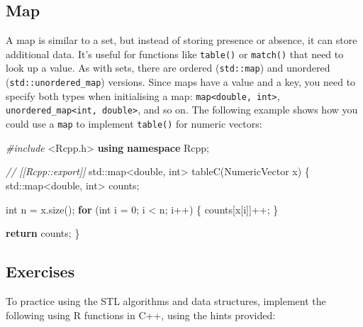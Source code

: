 \documentclass[]{book}
\newenvironment{Shaded}{\begin{snugshade}}{\end{snugshade}}
\newcommand{\BuiltInTok}[1]{#1}
\newcommand{\CommentTok}[1]{\textcolor[rgb]{0.37,0.37,0.37}{\textit{#1}}}
\newcommand{\ControlFlowTok}[1]{\textcolor[rgb]{0.27,0.27,0.27}{\textbf{#1}}}
\newcommand{\DataTypeTok}[1]{\textcolor[rgb]{0.27,0.27,0.27}{#1}}
\newcommand{\DecValTok}[1]{\textcolor[rgb]{0.06,0.06,0.06}{#1}}
\newcommand{\ImportTok}[1]{#1}
\newcommand{\KeywordTok}[1]{\textcolor[rgb]{0.27,0.27,0.27}{\textbf{#1}}}
\newcommand{\NormalTok}[1]{#1}
\newcommand{\PreprocessorTok}[1]{\textcolor[rgb]{0.37,0.37,0.37}{\textit{#1}}}
\begin{document}
\hypertarget{map}{%
\subsection{Map}\label{map}}


A map is similar to a set, but instead of storing presence or absence, it can store additional data. It's useful for functions like \texttt{table()} or \texttt{match()} that need to look up a value. As with sets, there are ordered (\texttt{std::map}) and unordered (\texttt{std::unordered\_map}) versions. Since maps have a value and a key, you need to specify both types when initialising a map: \texttt{map\textless{}double,\ int\textgreater{}}, \texttt{unordered\_map\textless{}int,\ double\textgreater{}}, and so on. The following example shows how you could use a \texttt{map} to implement \texttt{table()} for numeric vectors:

\begin{Shaded}
\begin{Highlighting}[]
\PreprocessorTok{#include }\ImportTok{<Rcpp.h>}
\KeywordTok{using} \KeywordTok{namespace}\NormalTok{ Rcpp;}

\CommentTok{// [[Rcpp::export]]}
\BuiltInTok{std::}\NormalTok{map<}\DataTypeTok{double}\NormalTok{, }\DataTypeTok{int}\NormalTok{> tableC(NumericVector x) \{}
  \BuiltInTok{std::}\NormalTok{map<}\DataTypeTok{double}\NormalTok{, }\DataTypeTok{int}\NormalTok{> counts;}

  \DataTypeTok{int}\NormalTok{ n = x.size();}
  \ControlFlowTok{for}\NormalTok{ (}\DataTypeTok{int}\NormalTok{ i = }\DecValTok{0}\NormalTok{; i < n; i++) \{}
\NormalTok{    counts[x[i]]++;}
\NormalTok{  \}}

  \ControlFlowTok{return}\NormalTok{ counts;}
\NormalTok{\}}
\end{Highlighting}
\end{Shaded}

\hypertarget{exercises-23}{%
\subsection{Exercises}\label{exercises-23}}

To practice using the STL algorithms and data structures, implement the following using R functions in C++, using the hints provided:
\end{document}
